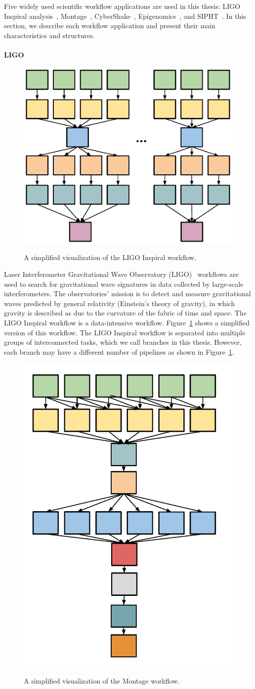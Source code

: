 Five widely used scientific workflow applications are used in this thesis: LIGO Inspiral analysis~\cite{LIGO}, Montage~\cite{Berriman2004}, CyberShake~\cite{Graves2010}, Epigenomics~\cite{Epigenome}, and SIPHT~\cite{SIPHT}. In this section, we describe each workflow application and present their main characteristics and structures.

\paragraph{\textbf{LIGO}}
\begin{figure}[!htb]
	\centering
	\includegraphics[width=0.45\linewidth]{figures/workflowsim/ligo_shape.pdf} \\
	\caption{A simplified visualization of the LIGO Inspiral workflow.}
	\label{fig:model_shape_ligo}
\end{figure}
Laser Interferometer Gravitational Wave Observatory (LIGO)~\cite{LIGO} workflows are used to search for gravitational wave signatures in data collected by large-scale interferometers. The observatories' mission is to detect and measure gravitational waves predicted by general relativity (Einstein's theory of gravity), in which gravity is described as due to the curvature of the fabric of time and space. The LIGO Inspiral workflow is a data-intensive workflow. Figure~\ref{fig:model_shape_ligo} shows a simplified version of this workflow. The LIGO Inspiral workflow is separated into multiple groups of interconnected tasks, which we call branches in this thesis. However, each branch may have a different number of pipelines as shown in Figure~\ref{fig:model_shape_ligo}. 

\begin{figure}[htb]
	\centering
	\includegraphics[width=0.4\linewidth]{figures/workflowsim/montage_shape.pdf} \\
	\caption{A simplified visualization of the Montage workflow.}
	\label{fig:model_shape_montage}
\end{figure}

